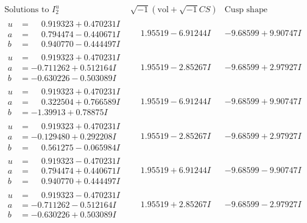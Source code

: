 \documentclass[1p]{elsarticle_modified}
\theoremstyle{definition}
\newcommand{\I}{\sqrt{-1}}
\begin{document}
$$\begin{array}{c|c|c}  
\text{Solutions to }I^u_{2}& \I (\text{vol} + \sqrt{-1}CS) & \text{Cusp shape}\\
 \hline 
\begin{aligned}
u &= \phantom{-}0.919323 + 0.470231 I \\
a &= \phantom{-}0.794474 - 0.440671 I \\
b &= \phantom{-}0.940770 - 0.444497 I\end{aligned}
 & \phantom{-}1.95519 - 6.91244 I & -9.68599 + 9.90747 I \\ \hline\begin{aligned}
u &= \phantom{-}0.919323 + 0.470231 I \\
a &= -0.711262 + 0.512164 I \\
b &= -0.630226 - 0.503089 I\end{aligned}
 & \phantom{-}1.95519 - 2.85267 I & -9.68599 + 2.97927 I \\ \hline\begin{aligned}
u &= \phantom{-}0.919323 + 0.470231 I \\
a &= \phantom{-}0.322504 + 0.766589 I \\
b &= -1.39913 + 0.78875 I\end{aligned}
 & \phantom{-}1.95519 - 6.91244 I & -9.68599 + 9.90747 I \\ \hline\begin{aligned}
u &= \phantom{-}0.919323 + 0.470231 I \\
a &= -0.129480 + 0.292208 I \\
b &= \phantom{-}0.561275 - 0.065984 I\end{aligned}
 & \phantom{-}1.95519 - 2.85267 I & -9.68599 + 2.97927 I \\ \hline\begin{aligned}
u &= \phantom{-}0.919323 - 0.470231 I \\
a &= \phantom{-}0.794474 + 0.440671 I \\
b &= \phantom{-}0.940770 + 0.444497 I\end{aligned}
 & \phantom{-}1.95519 + 6.91244 I & -9.68599 - 9.90747 I \\ \hline\begin{aligned}
u &= \phantom{-}0.919323 - 0.470231 I \\
a &= -0.711262 - 0.512164 I \\
b &= -0.630226 + 0.503089 I\end{aligned}
 & \phantom{-}1.95519 + 2.85267 I & -9.68599 - 2.97927 I \\ \hline\begin{aligned}

\end{aligned}
\end{array}$$
\end{document}
